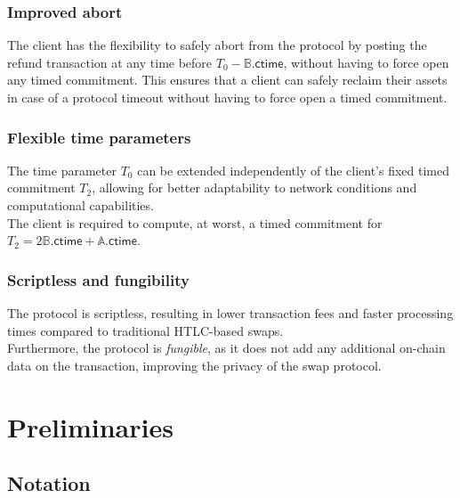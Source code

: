 \documentclass{article}      	%
\begin{document}
\subsubsection*{Improved abort}
The client has the flexibility to safely abort from the protocol by posting the refund transaction at any time before $T_0 - \mathbb{B}.\mathsf{ctime}$, without having to force open any timed commitment. This ensures that a client can safely reclaim their assets in case of a protocol timeout without having to force open a timed commitment.

\subsubsection*{Flexible time parameters}

The time parameter $T_0$ can be extended independently of the client's fixed timed commitment $T_2$, allowing for better adaptability to network conditions and computational capabilities. \\
The client is required to compute, at worst, a timed commitment for $T_2 = 2\mathbb{B}.\mathsf{ctime} + \mathbb{A}.\mathsf{ctime}$.

\subsubsection*{Scriptless and fungibility}
The protocol is scriptless, resulting in lower transaction fees and faster processing times compared to traditional HTLC-based swaps. \\
Furthermore, the protocol is \textit{fungible}, as it does not add any additional on-chain data on the transaction, improving the privacy of the swap protocol.

\section{Preliminaries}


\subsection{Notation}
\end{document}
